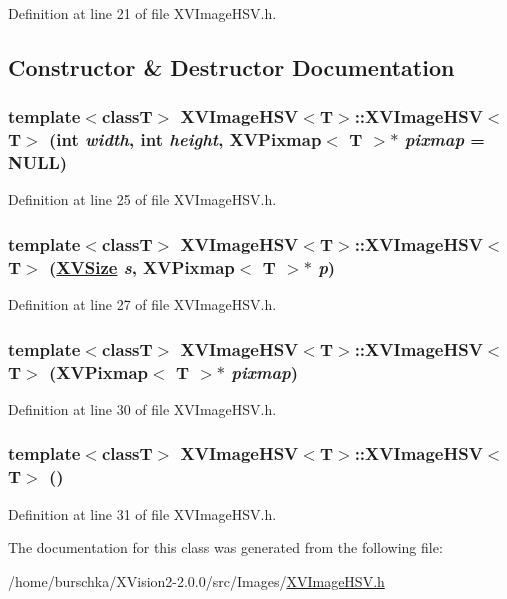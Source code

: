 Definition at line 21 of file XVImage\-HSV.h.

\subsection{Constructor \& Destructor Documentation}
\label{XVImageHSV_a0}
\hypertarget{class_XVImageHSV_a0}{
\subsubsection[XVImageHSV]{\setlength{\rightskip}{0pt plus 5cm}template$<$classT$>$ XVImage\-HSV$<$T$>$::XVImage\-HSV$<$T$>$ (int {\em width}, int {\em height}, XVPixmap$<$ T $>$$\ast$ {\em pixmap} = NULL)}}




Definition at line 25 of file XVImage\-HSV.h.\label{XVImageHSV_a1}
\hypertarget{class_XVImageHSV_a1}{
\subsubsection[XVImageHSV]{\setlength{\rightskip}{0pt plus 5cm}template$<$classT$>$ XVImage\-HSV$<$T$>$::XVImage\-HSV$<$T$>$ (\hyperlink{class_XVSize}{XVSize} {\em s}, XVPixmap$<$ T $>$$\ast$ {\em p})}}




Definition at line 27 of file XVImage\-HSV.h.\label{XVImageHSV_a2}
\hypertarget{class_XVImageHSV_a2}{
\subsubsection[XVImageHSV]{\setlength{\rightskip}{0pt plus 5cm}template$<$classT$>$ XVImage\-HSV$<$T$>$::XVImage\-HSV$<$T$>$ (XVPixmap$<$ T $>$$\ast$ {\em pixmap})}}




Definition at line 30 of file XVImage\-HSV.h.\label{XVImageHSV_a3}
\hypertarget{class_XVImageHSV_a3}{
\subsubsection[XVImageHSV]{\setlength{\rightskip}{0pt plus 5cm}template$<$classT$>$ XVImage\-HSV$<$T$>$::XVImage\-HSV$<$T$>$ ()}}




Definition at line 31 of file XVImage\-HSV.h.

The documentation for this class was generated from the following file:\begin{CompactItemize}
\item 
/home/burschka/XVision2-2.0.0/src/Images/\hyperlink{XVImageHSV.h-source}{XVImage\-HSV.h}\end{CompactItemize}
